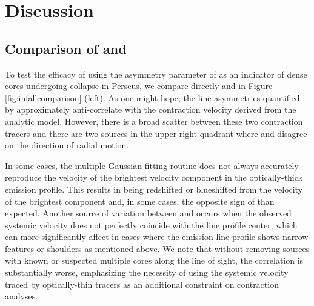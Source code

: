 \documentclass[iop,twocolappendix]{emulateapj}
\begin{document}
\section{Discussion}
\label{sec:discussion}

\subsection{Comparison of {\deltaV} and \Vin}
\label{subsec:comparison}

To test the efficacy of using the asymmetry parameter of \citet{Mardones1997} as an indicator of dense cores undergoing collapse in Perseus, we compare directly {\deltaV} and {\Vin} in Figure \ref{fig:infallcomparison} (left). As one might hope, the line asymmetries quantified by {\deltaV} approximately anti-correlate with the contraction velocity {\Vin} derived from the analytic model. However, there is a broad scatter between these two contraction tracers and there are two sources in the upper-right quadrant where {\deltaV} and {\Vin} disagree on the direction of radial motion. 

In some cases, the multiple Gaussian fitting routine does not always accurately reproduce the velocity of the brightest velocity component in the optically-thick emission profile.  This results in {\Vthick} being redshifted or blueshifted from the velocity of the brightest component and, in some cases, the opposite sign of {\deltaV} than expected. Another source of variation between {\deltaV} and {\Vin} occurs when the observed systemic velocity does not perfectly coincide with the line profile center, which can more significantly affect {\deltaV} in cases where the emission line profile shows narrow features or shoulders as mentioned above. We note that without removing sources with known or suspected multiple cores along the line of sight, the correlation is substantially worse, emphasizing the necessity of using the systemic velocity traced by optically-thin tracers as an additional constraint on contraction analyses. 
\end{document}
